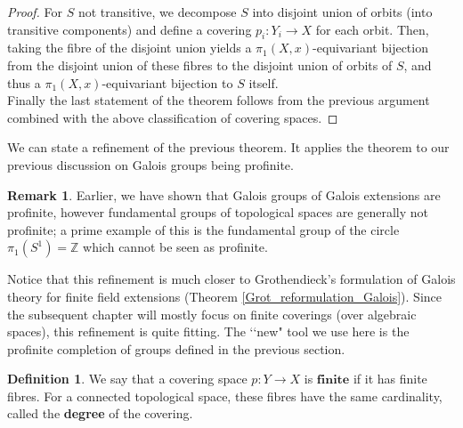 \documentclass{article}
\theoremstyle{plain}
\theoremstyle{definition}
\newtheorem{definition}[theorem]{Definition}
\newtheorem{remark}{Remark}
\begin{document}
\begin{proof}
    For $S$ not transitive, we decompose $S$ into disjoint union of orbits (into transitive components) and define a covering $p_i:Y_i\rightarrow X$ for each orbit. 
    Then, taking the fibre of the disjoint union yields a $\pi_1(X,x)$-equivariant bijection from the disjoint union of these fibres to the disjoint union of orbits of $S$, and thus a $\pi_1(X,x)$-equivariant bijection to $S$ itself.\\
    Finally the last statement of the theorem follows from the previous argument combined with the above classification of covering spaces.
\end{proof}


\noindent We can state a refinement of the previous theorem.
It applies the theorem to our previous discussion on Galois groups being profinite. 

\begin{remark}
    Earlier, we have shown that Galois groups of Galois extensions are profinite, however fundamental groups of topological spaces are generally not profinite; a prime example of this is the fundamental group of the circle $\pi_1(S^1) = \mathbb{Z}$ which cannot be seen as profinite.
\end{remark}

\noindent Notice that this refinement is much closer to Grothendieck's formulation of Galois theory for finite field extensions (Theorem \ref{Grot_reformulation_Galois}).
Since the subsequent chapter will mostly focus on \textit{}{finite} coverings (over algebraic spaces), this refinement is quite fitting.
The ‘‘new" tool we use here is the profinite completion of groups defined in the previous section.


\begin{definition}
    We say that a covering space $p:Y\rightarrow X$ is $\textbf{finite}$ if it has finite fibres. For a connected topological space, these fibres have the same cardinality, called the \textbf{degree} of the covering.
\end{definition}
\end{document}
